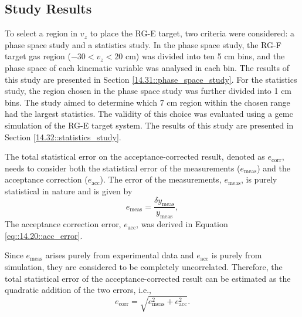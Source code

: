 \subsection{Study Results}
\label{14.30::study_results}
    To select a region in $v_z$ to place the RG-E target, two criteria were considered: a phase space study and a statistics study.
    In the phase space study, the RG-F target gas region ($-30 < v_z < 20$ cm) was divided into ten 5 cm bins, and the phase space of each kinematic variable was analysed in each bin.
    The results of this study are presented in Section \ref{14.31::phase_space_study}.
    For the statistics study, the region chosen in the phase space study was further divided into 1 cm bins.
    The study aimed to determine which 7 cm region within the chosen range had the largest statistics.
    The validity of this choice was evaluated using a gemc simulation of the RG-E target system.
    The results of this study are presented in Section \ref{14.32::statistics_study}.

    The total statistical error on the acceptance-corrected result, denoted as $e_\text{corr}$, needs to consider both the statistical error of the measurements ($e_\text{meas}$) and the acceptance correction ($e_\text{acc}$).
    The error of the measurements, $e_\text{meas}$, is purely statistical in nature and is given by
    \begin{equation*}
        e_\text{meas} = \frac{\delta y_\text{meas}}{y_\text{meas}},
    \end{equation*}
    The acceptance correction error, $e_\text{acc}$, was derived in Equation \eqref{eq::14.20::acc_error}.

    Since $e_\text{meas}$ arises purely from experimental data and $e_\text{acc}$ is purely from simulation, they are considered to be completely uncorrelated.
    Therefore, the total statistical error of the acceptance-corrected result can be estimated as the quadratic addition of the two errors, i.e.,
    \begin{equation*}
        e_\text{corr} = \sqrt{e_\text{meas}^2 + e_\text{acc}^2}.
    \end{equation*}

    
    
    
